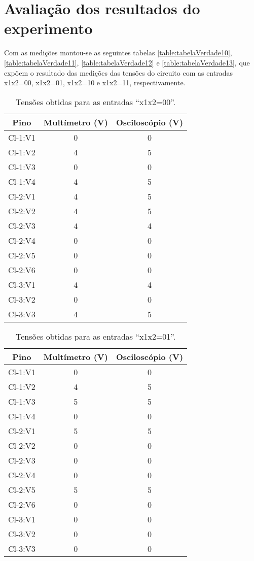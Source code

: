 \chapter{Avaliação dos resultados do experimento}
	Com as medições montou-se as seguintes tabelas \autoref{table:tabelaVerdade10},
	 \autoref{table:tabelaVerdade11}, \autoref{table:tabelaVerdade12} e
	 \autoref{table:tabelaVerdade13}, que expõem o resultado das medições das tensões do circuito
	 com as entradas x1x2=00, x1x2=01, x1x2=10 e x1x2=11, respectivamente.

	 \begin{table}[H]
 		\centering
 		\caption{Tensões obtidas para as entradas “x1x2=00”.}
 		\label{table:tabelaVerdade10}
 		\begin{tabular}{c|c|c}
 			\textbf{Pino} & \textbf{Multímetro (V)} & \textbf{Osciloscópio (V)}\\
 			\hline
 			Cl-1:V1 & 0 & 0 \\
 			Cl-1:V2 & 4 & 5 \\
 			Cl-1:V3 & 0 & 0 \\
 			Cl-1:V4 & 4 & 5 \\
 			\hline
 			Cl-2:V1 & 4 & 5 \\
 			Cl-2:V2 & 4 & 5 \\
 			Cl-2:V3 & 4 & 4 \\
 			Cl-2:V4 & 0 & 0 \\
 			Cl-2:V5 & 0 & 0 \\
 			Cl-2:V6 & 0 & 0 \\
 			\hline
 			Cl-3:V1 & 4 & 4 \\
 			Cl-3:V2 & 0 & 0 \\
 			Cl-3:V3 & 4 & 5 \\
 		\end{tabular}
 	\end{table}

 	\begin{table}[H]
 		\centering
 		\caption{Tensões obtidas para as entradas “x1x2=01”.}
 		\label{table:tabelaVerdade11}
 		\begin{tabular}{c|c|c}
 			\textbf{Pino} & \textbf{Multímetro (V)} & \textbf{Osciloscópio (V)}\\
 			\hline
 			Cl-1:V1 & 0 & 0 \\
 			Cl-1:V2 & 4 & 5 \\
 			Cl-1:V3 & 5 & 5 \\
 			Cl-1:V4 & 0 & 0 \\
 			\hline
 			Cl-2:V1 & 5 & 5 \\
 			Cl-2:V2 & 0 & 0 \\
 			Cl-2:V3 & 0 & 0 \\
 			Cl-2:V4 & 0 & 0 \\
 			Cl-2:V5 & 5 & 5 \\
 			Cl-2:V6 & 0 & 0 \\
 			\hline
 			Cl-3:V1 & 0 & 0 \\
 			Cl-3:V2 & 0 & 0 \\
 			Cl-3:V3 & 0 & 0 \\
 		\end{tabular}
 	\end{table}

